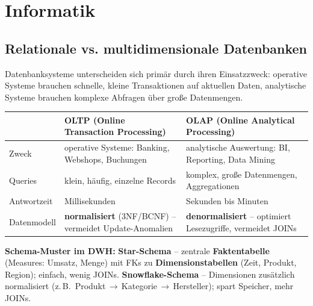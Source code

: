\section{Informatik}

\subsection{Relationale vs. multidimensionale Datenbanken}


Datenbanksysteme unterscheiden sich primär durch ihren Einsatzzweck: operative Systeme brauchen schnelle, kleine Transaktionen auf aktuellen Daten, analytische Systeme brauchen komplexe Abfragen über große Datenmengen.

\begin{table}[H]
  \centering
  \begin{tabularx}{\linewidth}{L{1.8cm} L{7.7cm} L{5cm}}
    & \textbf{OLTP} (Online Transaction Processing) & \textbf{OLAP} (Online Analytical Processing) \\
    \midrule
    Zweck & operative Systeme: Banking, Webshops, Buchungen & analytische Auswertung: BI, Reporting, Data Mining \\
    Queries & klein, häufig, einzelne Records & komplex, große Datenmengen, Aggregationen \\
    Antwortzeit & Millisekunden & Sekunden bis Minuten \\
    Datenmodell & \textbf{normalisiert} (3NF/BCNF) -- vermeidet Update-Anomalien & \textbf{denormalisiert} -- optimiert Lesezugriffe, vermeidet JOINs \\
  \end{tabularx}
\end{table}


\textbf{Schema-Muster im DWH:} \textbf{Star-Schema} -- zentrale \textbf{Faktentabelle} (Measures: Umsatz, Menge) mit FKs zu \textbf{Dimensionstabellen} (Zeit, Produkt, Region); einfach, wenig JOINs. \textbf{Snowflake-Schema} -- Dimensionen zusätzlich normalisiert (z.\,B.\ Produkt\,$\to$\,Kategorie\,$\to$\,Hersteller); spart Speicher, mehr JOINs.

